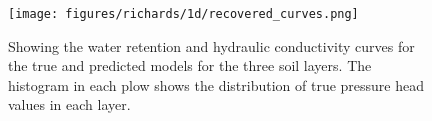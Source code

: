 \begin{figure}[!htbp]
\begin{center}
\texttt{[image: figures/richards/1d/recovered\_curves.png]}
\end{center}
\caption{
Showing the water retention and hydraulic conductivity curves for the true and predicted models for the three soil layers. The histogram in each plow shows the distribution of true pressure head values in each layer.
}
\label{fig:richards-1d-recovered_curves}
\end{figure}
